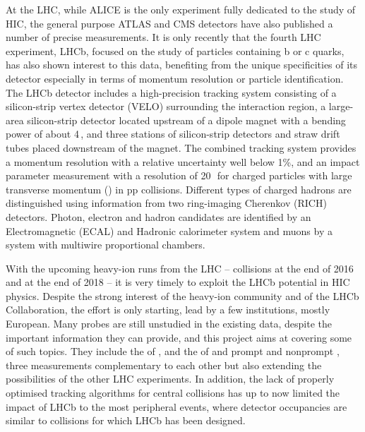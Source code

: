\documentclass[a4paper,11pt]{article}
\begin{document}
At the LHC, while
ALICE is the only experiment fully dedicated to the study of HIC, the general purpose ATLAS and CMS detectors have also published a number of precise
measurements. It is only recently that the fourth LHC experiment, LHCb, focused on the study of particles containing b or c quarks, 
has also shown interest to this data, benefiting from the unique 
specificities of its detector especially in terms of momentum resolution or particle identification. 
%
The LHCb detector includes a high-precision tracking system consisting of a silicon-strip vertex detector (VELO) surrounding the interaction region, a large-area silicon-strip detector located upstream of a dipole magnet with a bending power of about 4\,\tesla\meter, and three stations of silicon-strip detectors and straw drift tubes placed downstream of the magnet. The combined tracking system provides a momentum resolution with a relative uncertainty well below 1\%, and an impact parameter
 measurement with a resolution of 20\,\micro\meter\ for charged particles with large transverse momentum (\pt) in pp collisions. Different types of charged hadrons are distinguished using information from two ring-imaging Cherenkov (RICH) detectors. Photon, electron and hadron candidates
are identified by an Electromagnetic (ECAL) and Hadronic calorimeter system
and muons by a system with multiwire proportional chambers.

With the upcoming heavy-ion runs from the LHC -- \ppb collisions at the end of 2016 and \pbpb at the end of 2018 --
it is very timely to exploit the LHCb potential in HIC physics. Despite the strong interest of the heavy-ion community and of the LHCb Collaboration,
the effort is only starting, lead by a few institutions, mostly European. Many probes are still unstudied in the existing data, despite the important
information they can provide, and this project aims at covering some of such topics. They include the \rpa of \PgUabc, and the \raa of \Dz and prompt and nonprompt \Jpsi, three measurements complementary to each other but also extending the possibilities of the other LHC experiments.
%
In addition, the lack of properly optimised tracking algorithms for 
 \PbPb central collisions has up to now limited the impact of LHCb to the most peripheral events, where detector occupancies are similar to \pp collisions for which LHCb has been designed.
\end{document}
